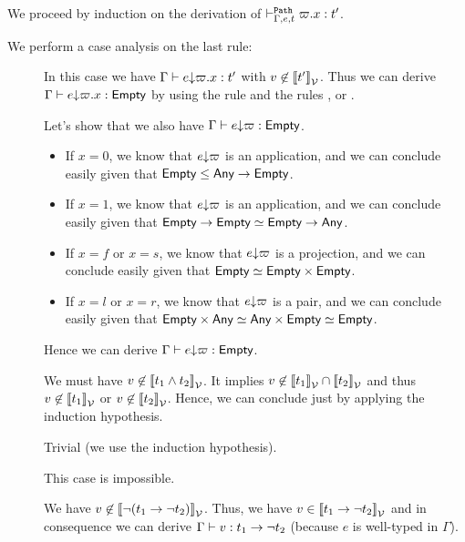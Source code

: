 \documentclass[a4paper]{article}
\theoremstyle{definition}
\begin{document}
        We proceed by induction on the derivation of $\vdash^{\texttt{Path}}_{\Gamma,e,t} \varpi.x:t'$.

        We perform a case analysis on the last rule:
        \begin{description}
          \item[] In this case we have $\Gamma \vdash e{\downarrow}\varpi.x : t'$ with $v \not\in {\llbracket t' \rrbracket}_{\mathcal{V}}$.
          Thus we can derive $\Gamma \vdash e{\downarrow}\varpi.x : \textsf{Empty}$ by using the rule  and the rules ,  or .

          Let's show that we also have $\Gamma \vdash e{\downarrow}\varpi : \textsf{Empty}$.
          \begin{itemize}
            \item If $x=0$, we know that $e{\downarrow}\varpi$ is an application, and we can conclude easily given that $\textsf{Empty} \leq \textsf{Any}\to \textsf{Empty}$.
            \item If $x=1$, we know that $e{\downarrow}\varpi$ is an application, and we can conclude easily given that $\textsf{Empty}\to \textsf{Empty} \simeq \textsf{Empty}\to \textsf{Any}$.
            \item If $x=f$ or $x=s$, we know that $e{\downarrow}\varpi$ is a projection, and we can conclude easily given that $\textsf{Empty} \simeq \textsf{Empty}\times \textsf{Empty}$.
            \item If $x=l$ or $x=r$, we know that $e{\downarrow}\varpi$ is a pair, and we can conclude easily given that $\textsf{Empty}\times \textsf{Any} \simeq \textsf{Any}\times \textsf{Empty} \simeq \textsf{Empty}$.
          \end{itemize}
          Hence we can derive $\Gamma \vdash e{\downarrow}\varpi : \textsf{Empty}$.

          \item[] We must have $v \not\in {\llbracket t_1 \land t_2 \rrbracket}_{\mathcal{V}}$. It implies $v \not\in {\llbracket t_1 \rrbracket}_{\mathcal{V}} \cap {\llbracket t_2 \rrbracket}_{\mathcal{V}}$
          and thus $v \not\in {\llbracket t_1 \rrbracket}_{\mathcal{V}}$ or $v \not\in {\llbracket t_2 \rrbracket}_{\mathcal{V}}$. Hence, we can conclude just by applying the induction hypothesis.
          \item[] Trivial (we use the induction hypothesis).
          \item[] This case is impossible.
          \item[] We have $v \not\in {\llbracket \neg (t_1\to \neg t_2) \rrbracket}_{\mathcal{V}}$. Thus, we have $v \in {\llbracket t_1\to \neg t_2 \rrbracket}_{\mathcal{V}}$
          and in consequence we can derive $\Gamma \vdash v:t_1\to \neg t_2$ (because $e$ is well-typed in $\Gamma$).


\end{description}
\end{document}
